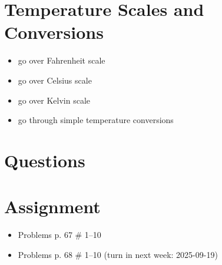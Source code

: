 \documentclass[10pt, oneside]{article}   	%
\begin{document}
\section*{Temperature Scales and Conversions}
\begin{itemize}
\item go over Fahrenheit scale
\item go over Celsius scale
\item go over Kelvin scale
\item go through simple temperature conversions
\end{itemize}

\section*{Questions}

\section*{Assignment}
\begin{itemize}
\item Problems p. 67 \# 1--10
\item Problems p. 68 \# 1--10 (turn in next week: 2025-09-19)
\end{itemize}
\end{document}
